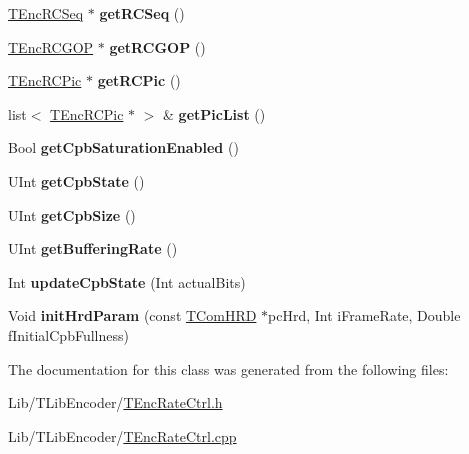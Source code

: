 \begin{DoxyCompactItemize}
\hyperlink{class_t_enc_r_c_seq}{T\+Enc\+R\+C\+Seq} $\ast$ {\bfseries get\+R\+C\+Seq} ()
\item 
\mbox{\label{class_t_enc_rate_ctrl_a9a37dc4d8969a2973c24232c63719c10}} 
\hyperlink{class_t_enc_r_c_g_o_p}{T\+Enc\+R\+C\+G\+OP} $\ast$ {\bfseries get\+R\+C\+G\+OP} ()
\item 
\mbox{\label{class_t_enc_rate_ctrl_acf728ef4507cb4047c41840f30546e29}} 
\hyperlink{class_t_enc_r_c_pic}{T\+Enc\+R\+C\+Pic} $\ast$ {\bfseries get\+R\+C\+Pic} ()
\item 
\mbox{\label{class_t_enc_rate_ctrl_a5ea922796176b2fa071d455cc1143336}} 
list$<$ \hyperlink{class_t_enc_r_c_pic}{T\+Enc\+R\+C\+Pic} $\ast$ $>$ \& {\bfseries get\+Pic\+List} ()
\item 
\mbox{\label{class_t_enc_rate_ctrl_a1e9e1d221587acbe5312aca017db2f6b}} 
Bool {\bfseries get\+Cpb\+Saturation\+Enabled} ()
\item 
\mbox{\label{class_t_enc_rate_ctrl_a54d9f28941cd184834d1e331915ad59b}} 
U\+Int {\bfseries get\+Cpb\+State} ()
\item 
\mbox{\label{class_t_enc_rate_ctrl_a233174b7bef3de028bf7f6f6f17abf22}} 
U\+Int {\bfseries get\+Cpb\+Size} ()
\item 
\mbox{\label{class_t_enc_rate_ctrl_a82d20ca026c6695775d245feb6611912}} 
U\+Int {\bfseries get\+Buffering\+Rate} ()
\item 
\mbox{\label{class_t_enc_rate_ctrl_a457f67ace2d7cb217766715c125da769}} 
Int {\bfseries update\+Cpb\+State} (Int actual\+Bits)
\item 
\mbox{\label{class_t_enc_rate_ctrl_af52a1ab000a19136d581322d972e0827}} 
Void {\bfseries init\+Hrd\+Param} (const \hyperlink{class_t_com_h_r_d}{T\+Com\+H\+RD} $\ast$pc\+Hrd, Int i\+Frame\+Rate, Double f\+Initial\+Cpb\+Fullness)
\end{DoxyCompactItemize}


The documentation for this class was generated from the following files\+:\begin{DoxyCompactItemize}
\item 
Lib/\+T\+Lib\+Encoder/\hyperlink{_t_enc_rate_ctrl_8h}{T\+Enc\+Rate\+Ctrl.\+h}\item 
Lib/\+T\+Lib\+Encoder/\hyperlink{_t_enc_rate_ctrl_8cpp}{T\+Enc\+Rate\+Ctrl.\+cpp}\end{DoxyCompactItemize}

